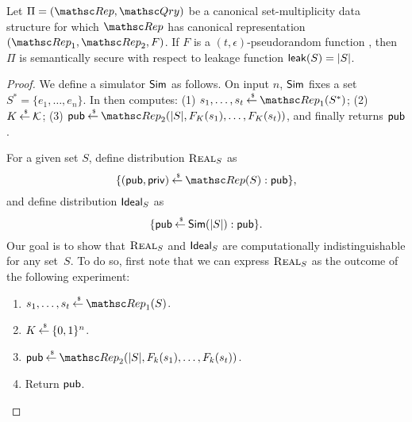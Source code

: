 \begin{theorem}
Let $\Pi=(\Rep, \Qry)$ be a canonical set-multiplicity data structure for which $\Rep$ has canonical representation
$(\Rep_1, \Rep_2, F)$. If $F$ is a $(t, \epsilon)$-pseudorandom
function , then $\Pi$ is semantically secure
with respect to leakage function ${\sf leak}(S) = |S|$.
\end{theorem}
\begin{proof}
We define a simulator ${\sf Sim}$ as follows. On input $n$, ${\sf Sim}$ fixes a
set $S^*=\{e_1, \ldots, e_n\}$. In then computes:
(1) $s_1, \ldots, s_t \getsr \Rep_1(S^*)$;
(2) $K {\:\stackrel{{\scriptscriptstyle \hspace{0.2em}\$}} {\leftarrow}\:} {\cal K}$;
(3) $\pubaux \getsr \Rep_2(|S|, F_K(s_1), \ldots, F_K(s_t))$, and
finally returns ${\sf pub}$.

\def\hyb{\mbox{{\sc Hyb}}}

For a given set $S$, define distribution $\mbox{{\sc Real}}_S$ as
\[ \{ (\pubaux, \privaux) \getsr \Rep(S) : \pubaux\},\]
and define distribution $\mbox{{\sf Ideal}}_S$ as
\[ \{ {\sf pub} {\:\stackrel{{\scriptscriptstyle \hspace{0.2em}\$}} {\leftarrow}\:} {\sf Sim}(|S|) : {\sf pub} \}.\]
Our goal is to show that $\mbox{{\sc Real}}_S$ and $\mbox{{\sf Ideal}}_S$ are computationally
indistinguishable for any set~$S$. 
To do so, first note that we can express $\mbox{{\sc Real}}_S$ as the outcome of
the following experiment: 
\begin{enumerate}
\item $s_1, \ldots, s_t \getsr \Rep_1(S)$.
\item $K {\:\stackrel{{\scriptscriptstyle \hspace{0.2em}\$}} {\leftarrow}\:} \{0,1\}^n$.
\item $\pubaux \getsr \Rep_2(|S|, F_k(s_1), \ldots, F_k(s_t))$.
\item Return ${\sf pub}$.
\end{enumerate}


\end{proof}
